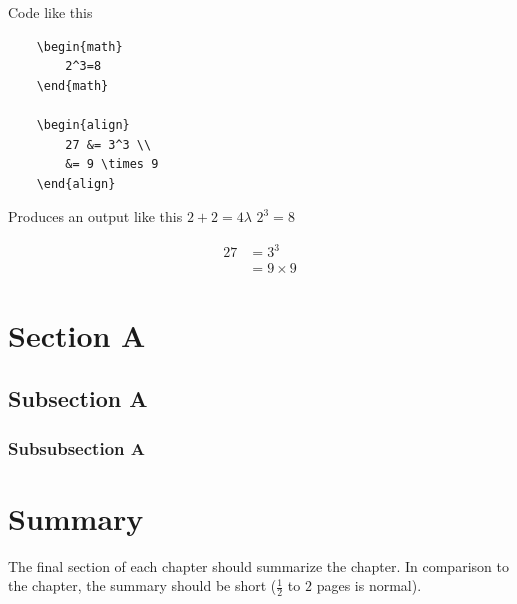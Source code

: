 Code like this \cite{Herbert:1981:Children-of-Dune}



\begin{lstlisting}
    \begin{math}
        2^3=8
    \end{math}
    
    \begin{align}
        27 &= 3^3 \\
        &= 9 \times 9
    \end{align}
\end{lstlisting}
Produces an output like this  $2+2=4 \lambda$
    \begin{math}
        2^3=8
    \end{math}
    
    \begin{align}
        27 &= 3^3 \\
        &= 9 \times 9
    \end{align}
\section{Section A}\label{sec:section_a}
\subsection{Subsection A}
\subsubsection{Subsubsection A}
    
    
    
\section{Summary}
\label{s:Background-Summary}

The final section of each chapter should summarize the chapter. In comparison to the chapter, the summary should be short ($\frac{1}{2}$ to $2$ pages is normal).

